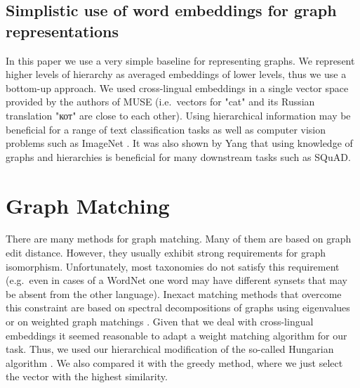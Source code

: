\documentclass[11pt,a4paper]{article}
\begin{document}
\subsection{Simplistic use of word embeddings for graph representations}
In this paper we use a very simple baseline for representing graphs. We represent higher levels of hierarchy as averaged embeddings of lower levels, thus we use a bottom-up approach. We used cross-lingual embeddings in a single vector space provided by the authors of MUSE (i.e.\ vectors for "cat" and its Russian translation \foreignlanguage{russian}{"кот"} are close to each other). Using hierarchical information may be beneficial for a range of text classification tasks \cite{tax2vec} as well as computer vision problems such as ImageNet \cite{hedging-bets}. It was also shown by Yang \citeyearpar{glomo} that using knowledge of graphs and hierarchies is beneficial for many downstream tasks such as SQuAD.


\section{Graph Matching}
There are many methods for graph matching. Many of them are based on graph edit distance. However, they usually exhibit strong requirements for graph isomorphism. Unfortunately, most taxonomies do not satisfy this requirement (e.g.\ even in cases of a WordNet one word may have different synsets that may be absent from the other language). Inexact matching methods that overcome this constraint are based on spectral decompositions of graphs using eigenvalues or on weighted graph matchings \cite{30years-graphs}. Given that we deal with cross-lingual embeddings it seemed reasonable to adapt a weight matching algorithm for our task. Thus, we used our hierarchical modification of the so-called Hungarian algorithm \cite[p.~201]{lawler} \cite[p.~48]{Riesen2010}. We also compared it with the greedy method, where we just select the vector with the highest similarity.
\end{document}
